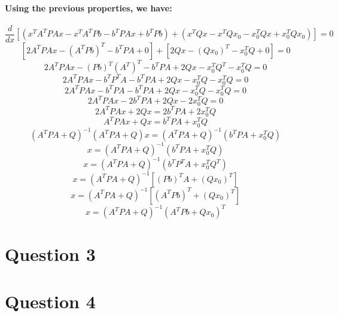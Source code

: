 \documentclass[a4paper]{article}    %
\begin{document}
\paragraph{Using the previous properties, we have:}
    \[\frac{d}{dx} [(x^TA^TPAx - x^TA^TPb -b^TPAx + b^TPb) + (x^TQx - x^TQx_0 - x_0^TQx + x_0^TQx_0)] = 0\]
    \[[2A^TPAx - (A^TPb)^T - b^TPA + 0] + [2Qx - (Qx_0)^T - x_0^TQ + 0] = 0\]
    \[2A^TPAx - (Pb)^T(A^T)^T - b^TPA + 2Qx - x_0^TQ^T - x_0^TQ = 0\]
    \[2A^TPAx - b^TP^TA - b^TPA + 2Qx - x_0^TQ - x_0^TQ = 0\]
    \[2A^TPAx - b^TPA - b^TPA + 2Qx - x_0^TQ - x_0^TQ = 0\]
    \[2A^TPAx - 2b^TPA + 2Qx - 2x_0^TQ = 0\]
    \[2A^TPAx + 2Qx = 2b^TPA + 2x_0^TQ\]
    \[A^TPAx + Qx = b^TPA + x_0^TQ\]
    \[(A^TPA + Q)^{-1}(A^TPA + Q)x = (A^TPA + Q)^{-1}(b^TPA + x_0^TQ)\]
    \[x = (A^TPA + Q)^{-1}(b^TPA + x_0^TQ)\]
    \[x = (A^TPA + Q)^{-1}(b^TP^TA + x_0^TQ^T)\]
    \[x = (A^TPA + Q)^{-1}[(Pb)^TA + (Qx_0)^T]\]
    \[x = (A^TPA + Q)^{-1}[(A^TPb)^T + (Qx_0)^T]\]
    \[\boxed{x = (A^TPA + Q)^{-1}(A^TPb + Qx_0)^T}\]
\newpage

\section*{Question 3}

\section*{Question 4}

\end{document}
